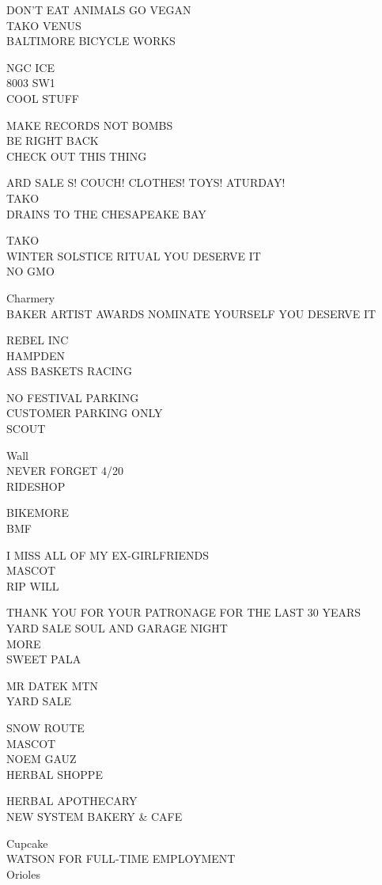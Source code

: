 \documentclass[10pt,letterpaper]{article}
\begin{document}
DON'T EAT ANIMALS GO VEGAN\\
TAKO VENUS\\
BALTIMORE BICYCLE WORKS

NGC ICE\\
8003 SW1\\
COOL STUFF

MAKE RECORDS NOT BOMBS\\
BE RIGHT BACK\\
CHECK OUT THIS THING

ARD SALE S! COUCH! CLOTHES! TOYS! ATURDAY!\\
TAKO\\
DRAINS TO THE CHESAPEAKE BAY

TAKO\\
WINTER SOLSTICE RITUAL YOU DESERVE IT\\
NO GMO

Charmery\\
BAKER ARTIST AWARDS NOMINATE YOURSELF YOU DESERVE IT

REBEL INC\\
HAMPDEN\\
ASS BASKETS RACING

NO FESTIVAL PARKING\\
CUSTOMER PARKING ONLY\\
SCOUT

Wall\\
NEVER FORGET 4/20\\
RIDESHOP

BIKEMORE\\
BMF

I MISS ALL OF MY EX{-}GIRLFRIENDS\\
MASCOT\\
RIP WILL

THANK YOU FOR YOUR PATRONAGE FOR THE LAST 30 YEARS\\
YARD SALE SOUL AND GARAGE NIGHT\\
MORE\\
SWEET PALA

MR DATEK MTN\\
YARD SALE

SNOW ROUTE\\
MASCOT\\
NOEM GAUZ\\
HERBAL SHOPPE

HERBAL APOTHECARY\\
NEW SYSTEM BAKERY \& CAFE

Cupcake\\
WATSON FOR FULL{-}TIME EMPLOYMENT\\
Orioles
\end{document}
